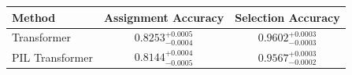     \begin{tabular}{lcc}
        \toprule
        Method & Assignment Accuracy & Selection Accuracy \\
        \midrule
        Transformer & $0.8253_{-0.0004}^{+0.0005}$ & $0.9602_{-0.0003}^{+0.0003}$ \\
        PIL Transformer & $0.8144_{-0.0005}^{+0.0004}$ & $0.9567_{-0.0002}^{+0.0003}$ \\
        \bottomrule
    \end{tabular}